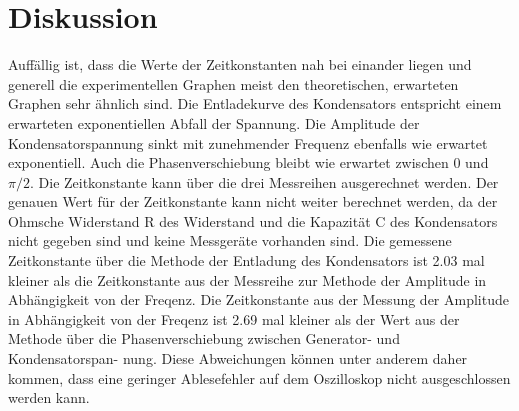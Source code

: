 \section{Diskussion}
\label{sec:Diskussion}

Auffällig ist, dass die Werte der Zeitkonstanten nah bei einander liegen und generell die
experimentellen Graphen meist den theoretischen, erwarteten Graphen sehr ähnlich sind.
Die Entladekurve des Kondensators entspricht einem erwarteten exponentiellen Abfall der
Spannung. Die Amplitude der Kondensatorspannung sinkt mit zunehmender Frequenz
ebenfalls wie erwartet exponentiell. Auch die Phasenverschiebung bleibt wie erwartet
zwischen 0 und $\pi/2$. Die Zeitkonstante kann über die drei Messreihen ausgerechnet
werden. Der genauen Wert für der Zeitkonstante kann nicht weiter berechnet werden, da
der Ohmsche Widerstand R des Widerstand und die Kapazität C des Kondensators nicht
gegeben sind und keine Messgeräte vorhanden sind. Die gemessene Zeitkonstante über
die Methode der Entladung des Kondensators ist 2.03 mal kleiner als die Zeitkonstante
aus der Messreihe zur Methode der Amplitude in Abhängigkeit von der Freqenz. Die
Zeitkonstante aus der Messung der Amplitude in Abhängigkeit von der Freqenz ist
2.69 mal kleiner als der Wert aus der Methode über die Phasenverschiebung zwischen
Generator- und Kondensatorspan- nung. Diese Abweichungen können unter anderem
daher kommen, dass eine geringer Ablesefehler auf dem Oszilloskop nicht ausgeschlossen
werden kann.
